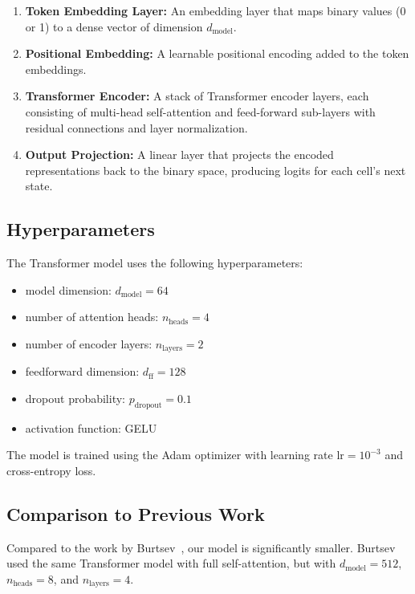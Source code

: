 \documentclass[runningheads]{llncs}
\begin{document}
\begin{enumerate}
    \item \textbf{Token Embedding Layer:} An embedding layer that maps binary values (0 or 1) to a dense vector of dimension $d_{\text{model}}$.
    
    \item \textbf{Positional Embedding:} A learnable positional encoding added to the token embeddings.
    
    \item \textbf{Transformer Encoder:} A stack of Transformer encoder layers, each consisting of multi-head self-attention and feed-forward sub-layers with residual connections and layer normalization.
    
    \item \textbf{Output Projection:} A linear layer that projects the encoded representations back to the binary space, producing logits for each cell's next state.
\end{enumerate}


\subsection{Hyperparameters}
\label{sec:hyperparameters}

The Transformer model uses the following hyperparameters:

\begin{itemize}
    \item model dimension: $d_{\text{model}} = 64$
    \item number of attention heads: $n_{\text{heads}} = 4$
    \item number of encoder layers: $n_{\text{layers}} = 2$
    \item feedforward dimension: $d_{\text{ff}} = 128$
    \item dropout probability: $p_{\text{dropout}} = 0.1$
    \item activation function: GELU
\end{itemize}

The model is trained using the Adam optimizer with learning rate $\text{lr} = 10^{-3}$ and cross-entropy loss.


\subsection{Comparison to Previous Work}
\label{sec:comparison}

Compared to the work by Burtsev~\cite{burtsev}, our model is significantly smaller. Burtsev used the same Transformer model with full self-attention, but with $d_{\text{model}} = 512$, $n_{\text{heads}} = 8$, and $n_{\text{layers}} = 4$.
\end{document}
